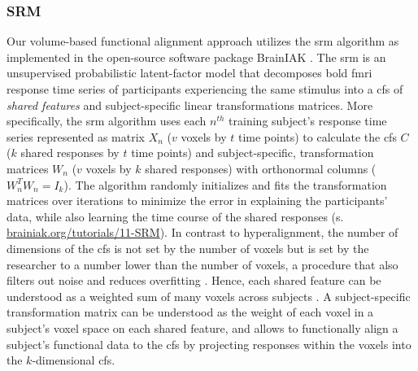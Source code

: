 \subsubsection{SRM}



Our volume-based functional alignment approach utilizes the \ac{srm} algorithm
\citep{chen2015reduced, richard2019fast} as implemented in the open-source
software package BrainIAK \citep[Brain Imaging Analysis Kit;
\href{https://brainiak.org}{\url{brainiak.org}};][]{kumar2020brainiak,
kumar2020brainiaktutorial}.
The \ac{srm} is an unsupervised probabilistic latent-factor model that
decomposes \ac{bold} \ac{fmri} response time series of participants experiencing
the same stimulus into a \ac{cfs} of \textit{shared features} \citep[also called
``\textit{shared feature space}'';][]{chen2015reduced} and subject-specific
linear transformations matrices.
More specifically, the \ac{srm} algorithm uses each $n^{th}$ training subject's
response time series represented as matrix $X_{n}$ ({$v$} voxels by $t$ time
points) to calculate the \ac{cfs} $C$ ($k$ shared responses by $t$ time points)
and subject-specific, transformation matrices $W_{n}$ ($v$ voxels by $k$ shared
responses) with orthonormal columns ($W_{n}^{T}W_{n}=I_{k}$).
The algorithm randomly initializes and fits the transformation matrices over
iterations to minimize the error in explaining the participants' data, while
also learning the time course of the shared responses (s.
\href{https://brainiak.org/tutorials/11-SRM/}{\url{brainiak.org/tutorials/11-SRM}}).
In contrast to hyperalignment, the number of dimensions of the \ac{cfs} is not
set by the number of voxels but is set by the researcher to a number lower than
the number of voxels, a procedure that also filters out noise and reduces
overfitting \citep{chen2015reduced}.
Hence, each shared feature can be understood as a weighted sum of many voxels
across subjects \citep{kumar2020brainiak}.
A subject-specific transformation matrix can be understood as the weight of each
voxel in a subject's voxel space on each shared feature, and allows to
functionally align a subject's functional data to the \ac{cfs} by projecting
responses within the voxels into the $k$-dimensional \ac{cfs}.



